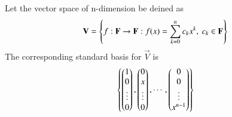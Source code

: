 Let the vector space of n-dimension be deined as
\begin{align}
        \mathbf{V}=\left\{f:\mathbf{F}\rightarrow \mathbf{F} : f(x)=\sum_{k=0}^{n}c_kx^k, \ c_k \in \mathbf{F} \right\}
\end{align}
The corresponding standard basis for $\vec{V}$ is
\begin{align}
	\left\{\begin{pmatrix}1\\0\\\vdots\\0\end{pmatrix},\begin{pmatrix}0\\x\\\vdots\\0\end{pmatrix},\cdots,\begin{pmatrix}0\\0\\\vdots\\x^{n-1}\end{pmatrix}\right\}
\end{align}
